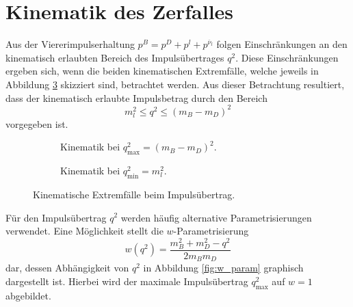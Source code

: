 \section{Kinematik des Zerfalles}
\label{sec:kinematik}
Aus der Viererimpulserhaltung $p^B = p^D + p^l + p^{\overline{\nu}_l}$ folgen Einschränkungen an den kinematisch erlaubten Bereich des Impulsübertrages $q^2$.
Diese Einschränkungen ergeben sich, wenn die beiden kinematischen Extremfälle, welche jeweils in Abbildung \ref{fig:recoil} skizziert sind, betrachtet werden.
Aus dieser Betrachtung resultiert, dass der kinematisch erlaubte Impulsbetrag durch den Bereich
\begin{equation}
  m_l^2 \leq q^2 \leq (m_B - m_D)^2
  \label{eqn:kinematik}
\end{equation}
vorgegeben ist.
\begin{figure}
  \centering
  \begin{subfigure}{0.48\textwidth}
    \centering
    \caption{Kinematik bei $q_\text{max}^2 = (m_B - m_D)^2$.}
    \label{fig:recoil1}
  \end{subfigure}
  \begin{subfigure}{0.48\textwidth}
    \centering
    \caption{Kinematik bei $q_\text{min}^2 = m_l^2$.}
    \label{fig:recoil2}
  \end{subfigure}
  \caption{Kinematische Extremfälle beim Impulsübertrag.}
  \label{fig:recoil}
\end{figure}

Für den Impulsübertrag $q^2$ werden häufig alternative Parametrisierungen verwendet.
Eine Möglichkeit stellt die $w$-Parametrisierung
\begin{equation}
  w(q^2) = \frac{m_B^2 + m_D^2 - q^2}{2 m_B m_D}
\end{equation}
dar, dessen Abhängigkeit von $q^2$ in Abbildung \ref{fig:w_param} graphisch dargestellt ist.
Hierbei wird der maximale Impulsübertrag $q_\text{max}^2$ auf $w=1$ abgebildet.

